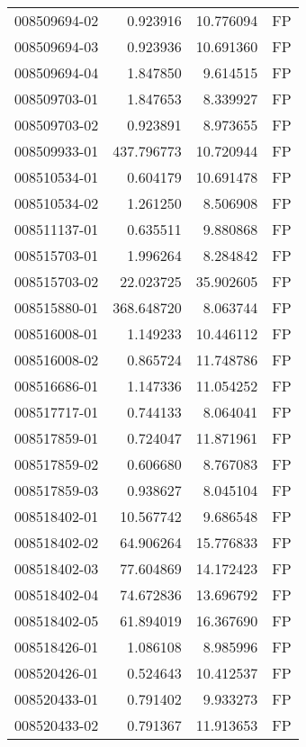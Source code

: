 \begin{tabular}{lrrl}
008509694-02 &    0.923916 &      10.776094 &   FP \\
008509694-03 &    0.923936 &      10.691360 &   FP \\
008509694-04 &    1.847850 &       9.614515 &   FP \\
008509703-01 &    1.847653 &       8.339927 &   FP \\
008509703-02 &    0.923891 &       8.973655 &   FP \\
008509933-01 &  437.796773 &      10.720944 &   FP \\
008510534-01 &    0.604179 &      10.691478 &   FP \\
008510534-02 &    1.261250 &       8.506908 &   FP \\
008511137-01 &    0.635511 &       9.880868 &   FP \\
008515703-01 &    1.996264 &       8.284842 &   FP \\
008515703-02 &   22.023725 &      35.902605 &   FP \\
008515880-01 &  368.648720 &       8.063744 &   FP \\
008516008-01 &    1.149233 &      10.446112 &   FP \\
008516008-02 &    0.865724 &      11.748786 &   FP \\
008516686-01 &    1.147336 &      11.054252 &   FP \\
008517717-01 &    0.744133 &       8.064041 &   FP \\
008517859-01 &    0.724047 &      11.871961 &   FP \\
008517859-02 &    0.606680 &       8.767083 &   FP \\
008517859-03 &    0.938627 &       8.045104 &   FP \\
008518402-01 &   10.567742 &       9.686548 &   FP \\
008518402-02 &   64.906264 &      15.776833 &   FP \\
008518402-03 &   77.604869 &      14.172423 &   FP \\
008518402-04 &   74.672836 &      13.696792 &   FP \\
008518402-05 &   61.894019 &      16.367690 &   FP \\
008518426-01 &    1.086108 &       8.985996 &   FP \\
008520426-01 &    0.524643 &      10.412537 &   FP \\
008520433-01 &    0.791402 &       9.933273 &   FP \\
008520433-02 &    0.791367 &      11.913653 &   FP \\

\end{tabular}
